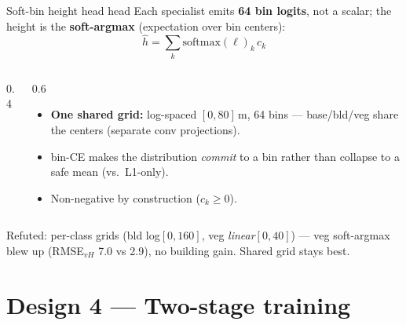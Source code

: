 \documentclass[aspectratio=169,11pt]{beamer}
\begin{document}
\begin{frame}{Soft-bin height head \hfill\small\textcolor{cHead}{head}}
  Each specialist emits \textbf{64 bin logits}, not a scalar; the height is the
  \textbf{soft-argmax} (expectation over bin centers):
  \[ \hat h = \sum_k \text{softmax}(\ell)_k\,c_k \]
  \begin{columns}[T]
    \begin{column}{0.4\textwidth}
      \centering
    \end{column}
    \begin{column}{0.6\textwidth}
      \begin{itemize}\small
        \item \textbf{One shared grid:} log-spaced $[0,80]$\,m, 64 bins ---
          base/bld/veg share the centers (separate conv projections).
        \item bin-CE makes the distribution \emph{commit} to a bin rather than
          collapse to a safe mean (vs.\ L1-only).
        \item Non-negative by construction ($c_k\ge0$).
      \end{itemize}
    \end{column}
  \end{columns}
  \vspace{0.3em}
  {\footnotesize \textcolor{cToken}{Refuted:} per-class grids
   (bld log$[0,160]$, veg \emph{linear}$[0,40]$) --- veg soft-argmax blew up
   (RMSE$_{vH}$ 7.0 vs 2.9), no building gain. Shared grid stays best.}
\end{frame}

\section{Design 4 --- Two-stage training}
\end{document}
